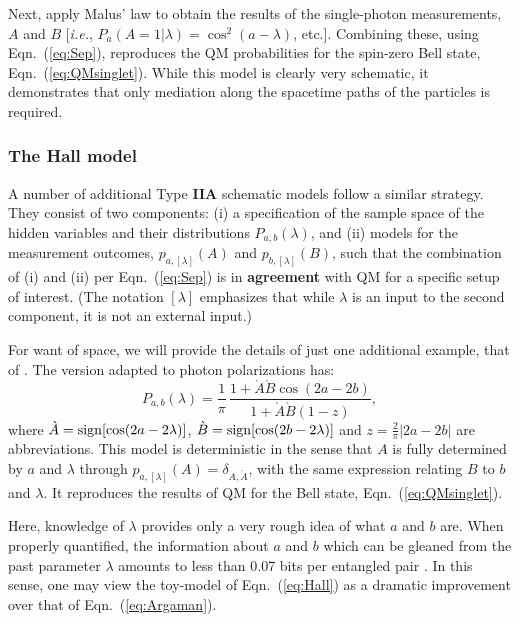\documentclass[onecolumn, nofootinbib, 12pt]{revtex4-1}
\newcommand{\eq}[1]{{Eqn.~(\ref{#1})}}
\begin{document}
Next, apply Malus' law to obtain the results of the single-photon measurements, $A$ and $B$ [\emph{i.e.}, $P_a(A=1|\lambda)=\cos^2(a-\lambda)$, etc.]. Combining these, using Eqn.~(\ref{eq:Sep}), reproduces the QM probabilities for the spin-zero Bell state, \eq{eq:QMsinglet}.  While this model is clearly very schematic, it demonstrates that only mediation along the spacetime paths of the particles is required.  

\subsubsection{The Hall model}
\label{sec:Hall}

A number of additional Type {\bf IIA} schematic models follow a similar strategy.  They consist of two components: (i) a specification of the sample space of the hidden variables and their distributions $P_{a,b}(\lambda)$, and (ii) models for the measurement outcomes, $p_{a,[\lambda]}(A)$ and $p_{b,[\lambda]}(B)$, such that the combination of (i) and (ii) per Eqn.~(\ref{eq:Sep}) is in {\bf agreement} with QM for a specific setup of interest.  (The notation $[\lambda]$ emphasizes that while $\lambda$ is an input to the second component, it is not an external input.)

For want of space, we will provide the details of just one additional example, that of \textcite{hall2010}.  The version adapted to photon polarizations \cite{argaman2018} has:
\begin{equation}
\label{eq:Hall}
P_{a,b}
(\lambda) = \frac{1}{\pi} \, 
\frac{1 + \grave A \grave B \cos(2a-2b)}{1 + \grave A \grave B (1-z)} ,
\end{equation}
where $\grave A = {\rm sign}[\cos(2a-2\lambda)]$, $\grave B = {\rm sign}[\cos(2b-2\lambda)]$ and $z=\frac{2}{\pi} |2a-2b|$ are abbreviations.  This model is deterministic in the sense that $A$ is fully determined by $a$ and $\lambda$ through $p_{a,[\lambda]}(A)=\delta_{A,\grave A}$, with the same expression relating $B$ to $b$ and $\lambda$.  It reproduces the results of QM for the Bell state, Eqn.~(\ref{eq:QMsinglet}).

Here, knowledge of $\lambda$ provides only a very rough idea of what $a$ and $b$ are.  When properly quantified, the information about $a$ and $b$ which can be gleaned from the past parameter $\lambda$ amounts to less than 0.07 bits per entangled pair \cite{hall2016}.  In this sense, one may view the toy-model of Eqn.~(\ref{eq:Hall}) as a dramatic improvement over that of Eqn.~(\ref{eq:Argaman}).
\end{document}
